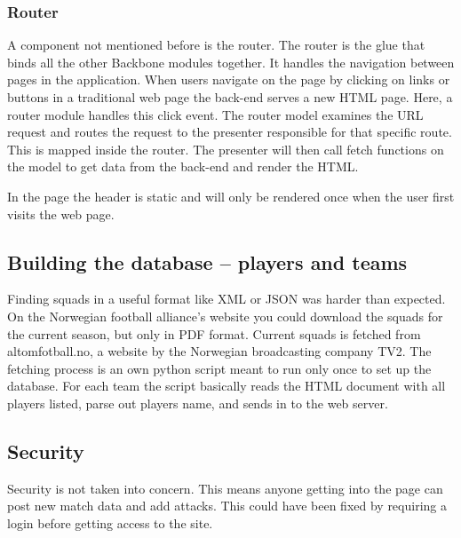 

\subsubsection{Router}

A component not mentioned before is the router. The router is the glue that binds all the other Backbone modules together. It handles the navigation between pages in the application. When users navigate on the page by clicking on links or buttons in a traditional web page the back-end serves a new HTML page. Here, a router module handles this click event. The router model examines the URL request and routes the request to the presenter responsible for that specific route. This is mapped inside the router. The presenter will then call fetch functions on the model to get data from the back-end and render the HTML.

In the page the header is static and will only be rendered once when the user first visits the web page. 

\subsection{Building the database – players and teams}

Finding squads in a useful format like \ac{XML} or \ac{JSON} was harder than expected. On the Norwegian football alliance's website you could download the squads for the current season, but only in PDF format. Current squads is fetched from altomfotball.no, a website by the Norwegian broadcasting company TV2. The fetching process is an own python script meant to run only once to set up the database. For each team the script basically reads the HTML document with all players listed, parse out players name, and sends in to the web server.

\subsection{Security}
Security is not taken into concern. This means anyone getting into the page can post new match data and add attacks. This could have been fixed by requiring a login before getting access to the site. 








